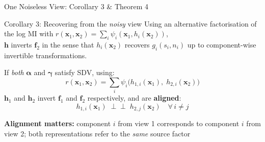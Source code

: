 \documentclass[aspectratio=169, 10pt]{beamer}
\begin{document}
\begin{frame}{One Noiseless View: Corollary 3 \& Theorem 4}
  \begin{block}{Corollary 3: Recovering from the \emph{noisy} view}
    Using an alternative factorisation of the log MI with
    $r(\mathbf{x}_1,\mathbf{x}_2)=\sum_i \psi_i(\mathbf{x}_1, h_i(\mathbf{x}_2))$,\\
    $\mathbf{h}$ inverts $\mathbf{f}_2$ in the sense that $h_i(\mathbf{x}_2)$ recovers
    $g_i(s_i,n_i)$ up to component-wise invertible transformations.
  \end{block}

  \bigskip
  \begin{theorem}
    If \emph{both} $\boldsymbol{\alpha}$ and $\boldsymbol{\gamma}$ satisfy SDV, using:
    \[
      r(\mathbf{x}_1,\mathbf{x}_2) = \sum_i \psi_i\!\bigl(h_{1,i}(\mathbf{x}_1),\;h_{2,i}(\mathbf{x}_2)\bigr)
    \]
    $\mathbf{h}_1$ and $\mathbf{h}_2$ invert $\mathbf{f}_1$ and $\mathbf{f}_2$ respectively, and are \textbf{aligned}:
    \[
      h_{1,i}(\mathbf{x}_1) \;\perp\!\!\!\perp\; h_{2,j}(\mathbf{x}_2)
      \quad \forall\, i\neq j
    \]
  \end{theorem}

  \medskip
  \textbf{Alignment matters:} component $i$ from view 1 corresponds to component $i$ from view 2;
  both representations refer to the \emph{same} source factor
\end{frame}
\end{document}
